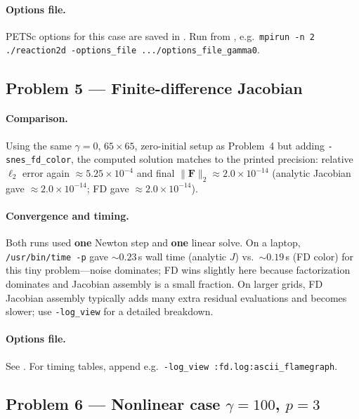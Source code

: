 \documentclass[11pt]{article}
\begin{document}
\paragraph{Options file.}
PETSc options for this case are saved in . Run from , e.g.\
\texttt{mpirun -n 2 ./reaction2d -options\_file .../options\_file\_gamma0}.

\subsection*{Problem 5 --- Finite-difference Jacobian}

\paragraph{Comparison.}
Using the same $\gamma=0$, $65\times 65$, zero-initial setup as Problem~4 but adding \texttt{-snes\_fd\_color}, the computed solution matches to the printed precision: relative $\ell_2$ error again $\approx 5.25\times 10^{-4}$ and final $\|\mathbf{F}\|_2 \approx 2.0\times 10^{-14}$ (analytic Jacobian gave $\approx 2.0\times 10^{-14}$; FD gave $\approx 2.0\times 10^{-14}$).

\paragraph{Convergence and timing.}
Both runs used \textbf{one} Newton step and \textbf{one} linear solve. On a laptop, \texttt{/usr/bin/time -p} gave $\sim 0.23$\,s wall time (analytic $J$) vs.\ $\sim 0.19$\,s (FD color) for this tiny problem---noise dominates; FD wins slightly here because factorization dominates and Jacobian assembly is a small fraction. On larger grids, FD Jacobian assembly typically adds many extra residual evaluations and becomes slower; use \texttt{-log\_view} for a detailed breakdown.

\paragraph{Options file.}
See . For timing tables, append e.g.\ \texttt{-log\_view :fd.log:ascii\_flamegraph}.

\subsection*{Problem 6 --- Nonlinear case $\gamma=100$, $p=3$}
\end{document}
